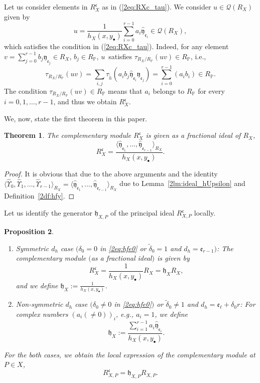 \documentclass[10pt,a4paper]{amsart}
\def\PP{{\mathbb P}}
\def\cQ{{\mathcal Q}}
\def\fc{{\mathfrak c}}
\def\fe{{\mathfrak e}}
\def\fh{{\mathfrak h}}
\def\fy{{\mathfrak y}}
\def\th{{\widetilde h}}
\def\tdelta{{\widetilde \delta}}
\def\hfy{{\widehat{\mathfrak y}}}
\def\hUpsilon{{\widehat \Upsilon}}
\numberwithin{equation}{section}
\newtheorem{Theorem}{Theorem}[section]
\newtheorem{Proposition}[Theorem]{Proposition}
 { \theoremstyle{definition}
\newtheorem{Definition}[Theorem]{Definition}
\newtheorem{Note}[Theorem]{Note}
\newtheorem{Example}[Theorem]{Example}
\newtheorem{Remark}[Theorem]{Remark} }
\begin{document}
Let us consider elements in $R_{X}^{\fc}$ as in (\ref{2eq:RXc_tau}).
We consider $u \in \cQ(R_X)$ given by
\begin{equation*}
u = \frac{1}{h_X(x, y_\bullet)} \sum_{i=0}^{r-1} a_i
 \hfy_{\fe_i}\in \cQ(R_X),%
\end{equation*}
which satisfies the condition in (\ref{2eq:RXc_tau}).
Indeed, for any element $v = \sum_{j=0}^{r-1} b_j \fy_{\fe_j}\in R_X$, $b_j \in R_\PP$, $u$~satisfies $\tau_{R_X/R_\PP}(u v) \in R_\PP$, i.e.,
\[
\tau_{R_X/R_\PP}(u v)= \sum_{i,j}
 \tau_\th(a_i b_j \hfy_{\fe_i} \fy_{\fe_j})=
\sum_{i=0}^{r-1}(a_{i} b_{i})\in R_\PP.
\]
The condition $\tau_{R_X/R_\PP}(u v) \in R_\PP$ means that $a_i$ belongs to $R_\PP$ for every $i=0, 1, \dots, r-1$, and thus we obtain $R_{X}^\fc$.

We, now, state the first theorem in this paper.


\begin{Theorem}\label{2pr:R_Xfc}
The complementary module $R_X^\fc$ is given as a fractional ideal of $R_X$,
\[
R_X^\fc=\frac{\langle\hfy_{\fe_1}, \dots, \hfy_{\fe_{r-1}}\rangle_{R_X}}{h_X(x,y_\bullet)}.
\]
\end{Theorem}


\begin{proof}
It is obvious that due to the above arguments and the identity $\big\langle \hUpsilon_{0}, \hUpsilon_{1}, \dots, \hUpsilon_{r-1}\big\rangle_{R_X}=\big\langle\hfy_{\fe_1}, \dots, \hfy_{\fe_{r-1}}\big\rangle_{R_X} $ due to Lemma~\ref{2lm:ideal_hUpsilon} and Definition~\ref{2df:hfy}.
\end{proof}


Let us identify the generator $\fh_{X,P}$ of the principal ideal $R_{X,P}^\fc$ locally.

\begin{Proposition}\label{2pr:d_hcases}\quad
\begin{enumerate}\itemsep=0pt

\item[$1.$] Symmetric $d_h$ case $(\delta_0 = 0$ in \eqref{2eq:hfe0} or $\tdelta_0=1$ and $d_h = \fe_{r-1})$:
The complementary module $($as a fractional ideal$)$ is given by
\begin{equation}
R_X^\fc=\frac{1}{h_X(x,y_\bullet)} R_X= \fh_X R_X,\label{2eq:R_X^fc1}
\end{equation}
and we define $\fh_X:=\frac{1}{h_X(x,y_\bullet)}$.

\item[$2.$] Non-symmetric $d_h$ case $(\delta_0 \neq 0$ in \eqref{2eq:hfe0}$)$ or $\tdelta_0\neq 1$ and $d_h = \fe_{\ell}+\delta_0 r$:
For complex numbers $(a_i(\neq 0))_i$, e.g., $a_i=1$, we define
\begin{equation*}
\fh_X:=\frac{\sum_{i=1}^{r-1}a_i \hfy_{\fe_i}}{h_X(x,y_\bullet)}.
\end{equation*}
\end{enumerate}
For the both cases, we obtain the local expression of the complementary module at $P\in X$,
\begin{equation}
R_{X,P}^\fc= \fh_{X,P} R_{X,P}.
\label{2eq:R_X^fc2}
\end{equation}
\end{Proposition}
\end{document}
